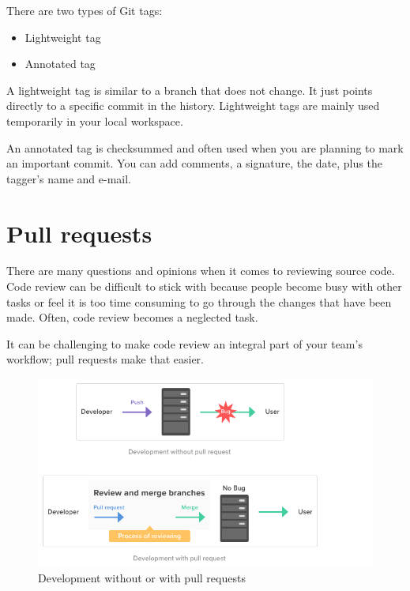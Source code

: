 \documentclass[10pt,a4paper,english]{report}
\begin{document}
    There are two types of Git tags:
    \begin{itemize}
        \item Lightweight tag
        \item Annotated tag
    \end{itemize}

    A lightweight tag is similar to a branch that does not change. It just points directly to a specific commit in the history. Lightweight tags are mainly used temporarily in your local workspace.

    An annotated tag is checksummed and often used when you are planning to mark an important commit. You can add comments, a signature, the date, plus the tagger's name and e-mail.

\chapter{Pull requests}
    \label{chap:pull-requests}

    There are many questions and opinions when it comes to reviewing source code. Code review can be difficult to stick with because people become busy with other tasks or feel it is too time consuming to go through the changes that have been made. Often, code review becomes a neglected task.

    It can be challenging to make code review an integral part of your team's workflow; pull requests make that easier.

    \begin{figure}[ht]
    \begin{center}
    \includegraphics[scale=0.5]{images/pull_requests_001.png}
    \end{center}
    \caption{Development without or with pull requests}
    \end{figure}
\end{document}
